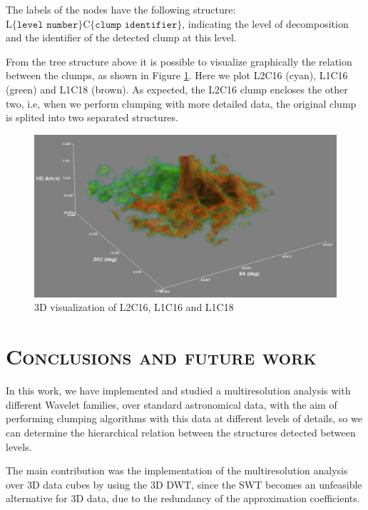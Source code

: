 \documentclass[letter, 11pt]{article}
\begin{document}
\begin{description}
    The labels of the nodes have the following structure: $\text{L}\{\texttt{level number}\}\text{C}\{\texttt{clump identifier}\}$, indicating the level of decomposition and the identifier of the detected clump at this level.

    From the tree structure above it is possible to visualize graphically the relation between the clumps, as shown in Figure \ref{fig:3Dplot}. Here we plot L2C16 (cyan), L1C16 (green) and L1C18 (brown). As expected, the L2C16 clump encloses the other two, i.e, when we perform clumping with more detailed data, the original clump is splited into two separated structures.   

    \begin{figure}[htpb!]
    \centering
    \includegraphics[width=12cm]{3Dplot}
    \caption{3D visualization of L2C16, L1C16 and L1C18}
    \label{fig:3Dplot}
    \end{figure}



\end{description}


\newpage
\section{\textsc{Conclusions and future work}} \label{conclusion}

In this work, we have implemented and studied a multiresolution analysis with different Wavelet families, over standard astronomical data, with the aim of performing clumping algorithms with this data at different levels of details, so we can determine the hierarchical relation between the structures detected between levels.


The main contribution was the implementation of the multiresolution analysis over 3D data cubes by using the 3D DWT, since the SWT becomes an unfeasible alternative for 3D data, due to the redundancy of the approximation coefficients.
\end{document}

